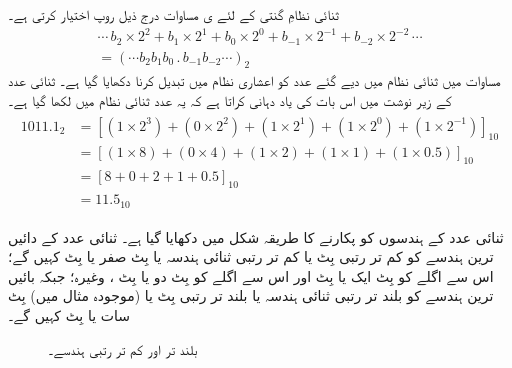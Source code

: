 	 ثنائی نظامِ گنتی کے لئے ی مساوات   درج ذیل روپ اختیار کرتی ہے۔
\begin{multline}\label{مساوات_ثنائی_عمومی_روپ_ثنائی}
\cdots\, b_2\times 2^2+b_1\times 2^1+b_0\times 2^0+b_{-1}\times 2^{-1}+b_{-2}\times 2^{-2}\,\cdots\\
=(\cdots b_2b_1b_0\, .\, b_{-1}b_{-2}\cdots)_{2}
\end{multline}
	مساوات    میں ثنائی نظام میں دیے گئے عدد کو اعشاری نظام میں تبدیل کرنا دکھایا گیا ہے۔ ثنائی عدد کے زیر نوشت میں  اس بات کی یاد دہانی کراتا ہے کہ یہ عدد ثنائی نظام میں لکھا گیا ہے۔
\begin{gather} 
\begin{aligned}\label{مساوات_ثنائی_مثال}
1011.1_2&=[(1\times 2^3)+(0\times 2^2)+(1\times 2^1)+(1\times 2^0)+(1\times 2^{-1})]_{10}\\
&=[(1\times 8)+(0\times 4)+(1\times 2)+(1\times 1)+(1\times 0.5)]_{10}\\
&=[8+0+2+1+0.5]_{10}\\
&=11.5_{10}
\end{aligned}
\end{gather}
	
 ثنائی عدد کے ہندسوں کو پکارنے کا طریقہ شکل   میں  دکھایا گیا ہے۔  ثنائی عدد  کے  دائیں ترین  ہندسے کو کم تر رتبی    بِٹ    یا کم تر رتبی   ثنائی ہندسہ یا  بِٹ صفر یا  بِٹ    کہیں گے؛  اس سے اگلے کو  بِٹ ایک یا بِٹ    اور اس سے اگلے کو بِٹ دو یا  بِٹ ،  وغیرہ؛ جبکہ بائیں  ترین  ہندسے کو بلند تر رتبی  ثنائی ہندسہ  یا بلند تر رتبی   بِٹ    یا (موجودہ مثال میں)     بِٹ سات یا  بِٹ    کہیں گے۔

\begin{figure}
\centering
{}
\caption{بلند تر اور کم تر رتبی ہندسے۔}
\label{شکل_ثنائی_رتبہ_ہندسہ}
\end{figure}

